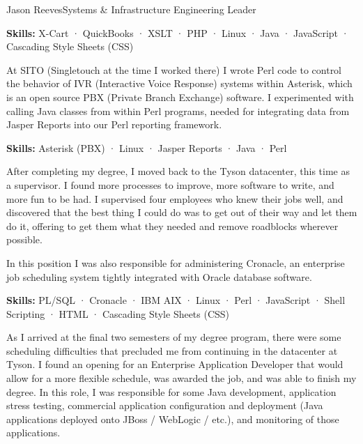 \documentclass{article}
\begin{document}
\begin{cv}{Jason Reeves}{Systems \& Infrastructure Engineering Leader}
\begin{cvevent}[Feb 2009][Jul 2011]
  \vspace*{3mm}
  \textbf{Skills:} X-Cart · QuickBooks · XSLT · PHP · Linux · Java · JavaScript · Cascading Style Sheets (CSS)
  \vspace*{5mm}
\end{cvevent}

\begin{cvevent}[Sep 2007][Feb 2009]
  At SITO (Singletouch at the time I worked there) I wrote Perl code to control the behavior of IVR (Interactive Voice Response) systems within Asterisk, which is an open source PBX (Private Branch Exchange) software. I experimented with calling Java classes from within Perl programs, needed for integrating data from Jasper Reports into our Perl reporting framework.
  
  \vspace*{3mm}
  \textbf{Skills:} Asterisk (PBX) · Linux · Jasper Reports · Java · Perl
  \vspace*{5mm}
\end{cvevent}

\begin{cvevent}[Sep 2005][Sep 2007]
  After completing my degree, I moved back to the Tyson datacenter, this time as a supervisor. I found more processes to improve, more software to write, and more fun to be had. I supervised four employees who knew their jobs well, and discovered that the best thing I could do was to get out of their way and let them do it, offering to get them what they needed and remove roadblocks wherever possible.
  \vspace*{3mm}
  
  In this position I was also responsible for administering Cronacle, an enterprise job scheduling system tightly integrated with Oracle database software.
  \vspace*{3mm}
  
  \textbf{Skills:} PL/SQL · Cronacle · IBM AIX · Linux · Perl · JavaScript · Shell Scripting · HTML · Cascading Style Sheets (CSS)
  \vspace*{5mm}
\end{cvevent}

\begin{cvevent}[Sep 2004][Sep 2005]
  As I arrived at the final two semesters of my degree program, there were some scheduling difficulties that precluded me from continuing in the datacenter at Tyson. I found an opening for an Enterprise Application Developer that would allow for a more flexible schedule, was awarded the job, and was able to finish my degree. In this role, I was responsible for some Java development, application stress testing, commercial application configuration and deployment (Java applications deployed onto JBoss / WebLogic / etc.), and monitoring of those applications.
  \vspace*{3mm}
  

\end{cvevent}
\end{cv}
\end{document}
